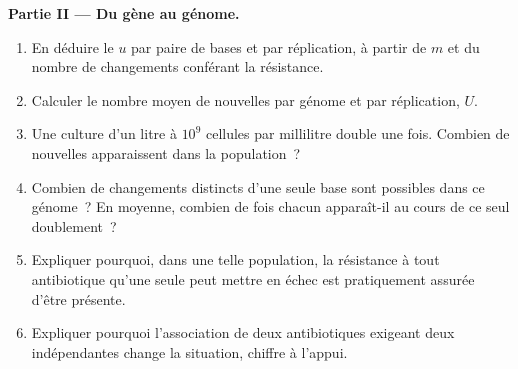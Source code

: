 \begin{problem}
\medskip
\noindent\textbf{Partie II --- Du gène au génome.}
\begin{enumerate}[resume]
  \item En déduire le  $u$ par paire de bases et par
        réplication, à partir de $m$ et du nombre de changements
        conférant la résistance.
  \item Calculer le nombre moyen de  nouvelles par génome et
        par réplication, $U$.
  \item Une culture d'un litre à $10^{9}$ cellules par millilitre double
        une fois. Combien de  nouvelles apparaissent dans la
        population~?
  \item Combien de changements distincts d'une seule base sont possibles
        dans ce génome~? En moyenne, combien de fois chacun apparaît-il
        au cours de ce seul doublement~?
  \item Expliquer pourquoi, dans une telle population, la résistance à
        tout antibiotique qu'une seule  peut mettre en échec est
        pratiquement assurée d'être présente.
  \item Expliquer pourquoi l'association de deux antibiotiques exigeant
        deux  indépendantes change la situation, chiffre à
        l'appui.
\end{enumerate}


\end{problem}
